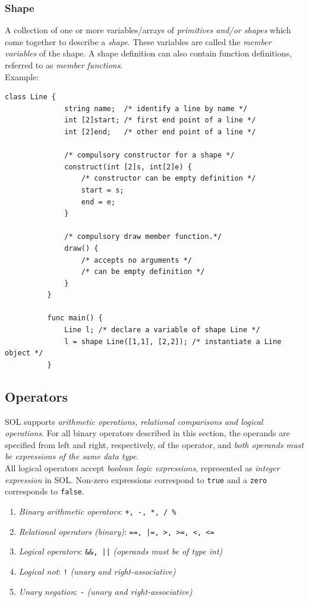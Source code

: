 \documentclass[letterpaper,12pt]{report}
\begin{document}
      \subsubsection{Shape}
        A collection of one or more variables/arrays of \textit{primitives and/or shapes} which come together to describe a \textit{shape}. These variables are called the \textit{member variables} of the shape. A shape definition can also contain function definitions, referred to as \textit{member functions}.\\
        Example:\\
        \begin{lstlisting}[style=sol]
          class Line {
              string name;  /* identify a line by name */
              int [2]start; /* first end point of a line */
              int [2]end;   /* other end point of a line */

              /* compulsory constructor for a shape */
              construct(int [2]s, int[2]e) {
                  /* constructor can be empty definition */
                  start = s;
                  end = e;
              }

              /* compulsory draw member function.*/
              draw() {
                  /* accepts no arguments */
                  /* can be empty definition */
              }
          }

          func main() {
              Line l; /* declare a variable of shape Line */
              l = shape Line([1,1], [2,2]); /* instantiate a Line object */
          }
        \end{lstlisting}

    \subsection{Operators}
    SOL supports \textit{arithmetic operations, relational comparisons and logical operations}. For all binary operators described in this section, the operands are specified from left and right, respectively, of the operator, and \textit{both operands must be expressions of the same data type}.\\
    All logical operators accept \textit{boolean logic expressions}, represented as \textit{integer expression} in SOL. Non-zero expressions correspond to \texttt{true} and a \texttt{zero} corresponds to \texttt{false}. 

    \begin{enumerate}
      \itemsep 0em
      \item \textit{Binary arithmetic operators}: \texttt{+, -, *, / \%}
      \item \textit{Relational operators (binary)}: \texttt{==, |=, >, >=, <, <=}
      \item \textit{Logical operators}: \texttt{\&\&, ||} \textit{(operands must be of type int)}
      \item \textit{Logical not}: \texttt{!} \textit{(unary and right-associative)}
      \item \textit{Unary negation}: \texttt{-} \textit{(unary and right-associative)}
    \end{enumerate}
\end{document}
